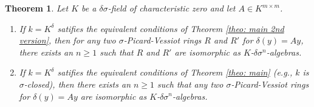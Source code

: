 \documentclass[oneside,reqno]{amsart}
\newtheorem{theo}{Theorem}[section]
\theoremstyle{definition}
\newcommand{\s}{\sigma}
\newcommand{\de}{\delta}
\begin{document}
\begin{theo}
	Let $K$ be a $\delta\sigma$-field of characteristic zero and let $A\in K^{m\times m}$.
	\begin{enumerate}
		\item If $k=K^\de$ satifies the equivalent conditions of Theorem \ref{theo: main 2nd version}, then for any two $\s$-Picard-Vessiot rings $R$ and $R'$ for $\delta(y)=Ay$, there exists an $n\geq 1$ such that $R$ and $R'$ are isomorphic as $K$-$\delta\sigma^n$-algebras.
		\item If $k=K^\de$ satifies the equivalent conditions of Theorem \ref{theo: main} (e.g., $k$ is $\s$-closed), then there exists an $n\geq 1$ such that any two $\s$-Picard-Vessiot rings for $\delta(y)=Ay$ are isomorphic as $K$-$\delta\sigma^n$-algebras.
	\end{enumerate}	
%	
%	
\end{theo}
\end{document}
